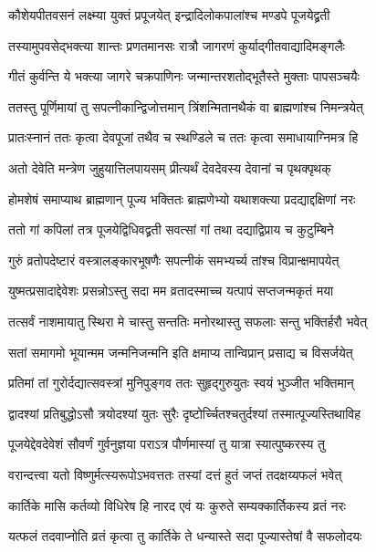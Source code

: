 \twolineshloka
{कौशेयपीतवसनं लक्ष्म्या युक्तं प्रपूजयेत्}
{इन्द्रादिलोकपालांश्च मण्डपे पूजयेद्व्रती} %

\twolineshloka
{तस्यामुपवसेद्भक्त्या शान्तः प्रणतमानसः}
{रात्रौ जागरणं कुर्याद्गीतवाद्यादिमङ्गलैः} %

\twolineshloka
{गीतं कुर्वन्ति ये भक्त्या जागरे चक्रपाणिनः}
{जन्मान्तरशतोद्भूतैस्ते मुक्ताः पापसञ्चयैः} %

\twolineshloka
{ततस्तु पूर्णिमायां तु सपत्नीकान्द्विजोत्तमान्}
{त्रिंशन्मितानथैकं वा ब्राह्मणांश्च निमन्त्रयेत्} %

\twolineshloka
{प्रातःस्नानं ततः कृत्वा देवपूजां तथैव च}
{स्थण्डिले च ततः कृत्वा समाधायाग्निमत्र हि} %

\twolineshloka
{अतो देवेति मन्त्रेण जुहुयात्तिलपायसम्}
{प्रीत्यर्थं देवदेवस्य देवानां च पृथक्पृथक्} %

\twolineshloka
{होमशेषं समाप्याथ ब्राह्मणान् पूज्य भक्तितः}
{ब्राह्मणेभ्यो यथाशक्त्या प्रदद्याद्दक्षिणां नरः} %

\twolineshloka
{ततो गां कपिलां तत्र पूजयेद्विधिवद्व्रती}
{सवत्सां गां तथा दद्याद्विप्राय च कुटुम्बिने} %

\twolineshloka
{गुरुं व्रतोपदेष्टारं वस्त्रालङ्कारभूषणैः}
{सपत्नीकं समभ्यर्च्य तांश्च विप्रान्क्षमापयेत्} %

\twolineshloka
{युष्मत्प्रसादाद्देवेशः प्रसन्नोऽस्तु सदा मम}
{व्रतादस्माच्च यत्पापं सप्तजन्मकृतं मया} %

\twolineshloka
{तत्सर्वं नाशमायातु स्थिरा मे चास्तु सन्ततिः}
{मनोरथास्तु सफलाः सन्तु भक्तिर्हरौ भवेत्} %

\twolineshloka
{सतां समागमो भूयान्मम जन्मनिजन्मनि}
{इति क्षमाप्य तान्विप्रान् प्रसाद्य च विसर्जयेत्} %

\twolineshloka
{प्रतिमां तां गुरोर्दद्यात्सवस्त्रां मुनिपुङ्गव}
{ततः सुहृद्गुरुयुतः स्वयं भुञ्जीत भक्तिमान्} %

\twolineshloka
{द्वादश्यां प्रतिबुद्धोऽसौ त्रयोदश्यां युतः सुरैः}
{दृष्टोर्च्चितश्चतुर्दश्यां तस्मात्पूज्यस्तिथाविह} %

\twolineshloka
{पूजयेद्देवदेवेशं सौवर्णं गुर्वनुज्ञया}
{पराऽत्र पौर्णमास्यां तु यात्रा स्यात्पुष्करस्य तु} %

\twolineshloka
{वरान्दत्त्वा यतो विष्णुर्मत्स्यरूपोऽभवत्ततः}
{तस्यां दत्तं हुतं जप्तं तदक्षय्यफलं भवेत्} %

\twolineshloka
{कार्तिके मासि कर्तव्यो विधिरेष हि नारद}
{एवं यः कुरुते सम्यक्कार्तिकस्य व्रतं नरः} %

\twolineshloka
{यत्फलं तदवाप्नोति व्रतं कृत्वा तु कार्तिके}
{ते धन्यास्ते सदा पूज्यास्तेषां वै सफलोदयः} %

